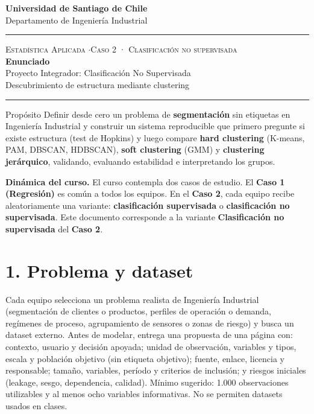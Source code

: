 \documentclass[11pt,letterpaper]{article}
\newcommand{\hrulethin}{\noindent\rule{\textwidth}{0.6pt}}
\begin{document}
\pagestyle{plain}
\begin{center}
    \textbf{\large Universidad de Santiago de Chile}\\[0.1cm]
    Departamento de Ingeniería Industrial
\end{center}
\vspace{0.15cm}\hrulethin\vspace{0.35cm}
\begin{center}
    {\scshape Estadística Aplicada \quad$\cdot$\quad Caso 2 · Clasificación no supervisada}\\[0.35cm]
    {\LARGE \textbf{Enunciado}}\\[0.15cm]
    {\large Proyecto Integrador: Clasificación No Supervisada}\\[0.2cm]
    Descubrimiento de estructura mediante clustering
\end{center}
\vspace{0.2cm}\hrulethin\vspace{0.4cm}
\begin{propbox}{Propósito}
Definir desde cero un problema de \textbf{segmentación} sin etiquetas en Ingeniería Industrial y construir un
sistema reproducible que primero pregunte si existe estructura (test de Hopkins) y luego compare \textbf{hard
clustering} (K-means, PAM, DBSCAN, HDBSCAN), \textbf{soft clustering} (GMM) y \textbf{clustering jerárquico},
validando, evaluando estabilidad e interpretando los grupos.
\end{propbox}

\textbf{Dinámica del curso.} El curso contempla dos casos de estudio. El \textbf{Caso 1 (Regresión)} es común a todos los equipos. En el \textbf{Caso 2}, cada equipo recibe aleatoriamente una variante: \textbf{clasificación supervisada} o \textbf{clasificación no supervisada}. Este documento corresponde a la variante \textbf{Clasificación no supervisada} del \textbf{Caso 2}.

\section*{1. Problema y dataset}
Cada equipo selecciona un problema realista de Ingeniería Industrial (segmentación de clientes o productos, perfiles de operación o demanda, regímenes de proceso, agrupamiento de sensores o zonas de riesgo) y busca un dataset externo. Antes de modelar, entrega una propuesta de una página con: contexto, usuario y decisión apoyada; unidad de observación, variables y tipos, escala y población objetivo (sin etiqueta objetivo); fuente, enlace, licencia y responsable; tamaño, variables, período y criterios de inclusión; y riesgos iniciales (leakage, sesgo, dependencia, calidad). Mínimo sugerido: 1.000 observaciones utilizables y al menos ocho variables informativas. No se permiten datasets usados en clases.
\end{document}
